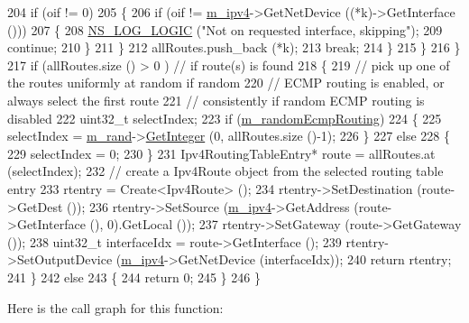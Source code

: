 \begin{DoxyCode}
204               \textcolor{keywordflow}{if} (oif != 0)
205                 \{
206                   \textcolor{keywordflow}{if} (oif != \hyperlink{classns3_1_1Ipv4GlobalRouting_a8ca97d33982a32fa41a98b56dbec2edc}{m\_ipv4}->GetNetDevice ((*k)->GetInterface ()))
207                     \{
208                       \hyperlink{group__logging_ga88acd260151caf2db9c0fc84997f45ce}{NS\_LOG\_LOGIC} (\textcolor{stringliteral}{"Not on requested interface, skipping"});
209                       \textcolor{keywordflow}{continue};
210                     \}
211                 \}
212               allRoutes.push\_back (*k);
213               \textcolor{keywordflow}{break};
214             \}
215         \}
216     \}
217   \textcolor{keywordflow}{if} (allRoutes.size () > 0 ) \textcolor{comment}{// if route(s) is found}
218     \{
219       \textcolor{comment}{// pick up one of the routes uniformly at random if random}
220       \textcolor{comment}{// ECMP routing is enabled, or always select the first route}
221       \textcolor{comment}{// consistently if random ECMP routing is disabled}
222       uint32\_t selectIndex;
223       \textcolor{keywordflow}{if} (\hyperlink{classns3_1_1Ipv4GlobalRouting_aecf81bc1f0bdbb4fff3fa7c56e4707a4}{m\_randomEcmpRouting})
224         \{
225           selectIndex = \hyperlink{classns3_1_1Ipv4GlobalRouting_a3cc74017538737dc3f6ec7f511a3481e}{m\_rand}->\hyperlink{classns3_1_1RandomVariableStream_a66cd94e6305ce7f000f1a9ff0fcb9aef}{GetInteger} (0, allRoutes.size ()-1);
226         \}
227       \textcolor{keywordflow}{else} 
228         \{
229           selectIndex = 0;
230         \}
231       Ipv4RoutingTableEntry* route = allRoutes.at (selectIndex); 
232       \textcolor{comment}{// create a Ipv4Route object from the selected routing table entry}
233       rtentry = Create<Ipv4Route> ();
234       rtentry->SetDestination (route->GetDest ());
236       rtentry->SetSource (\hyperlink{classns3_1_1Ipv4GlobalRouting_a8ca97d33982a32fa41a98b56dbec2edc}{m\_ipv4}->GetAddress (route->GetInterface (), 0).GetLocal ());
237       rtentry->SetGateway (route->GetGateway ());
238       uint32\_t interfaceIdx = route->GetInterface ();
239       rtentry->SetOutputDevice (\hyperlink{classns3_1_1Ipv4GlobalRouting_a8ca97d33982a32fa41a98b56dbec2edc}{m\_ipv4}->GetNetDevice (interfaceIdx));
240       \textcolor{keywordflow}{return} rtentry;
241     \}
242   \textcolor{keywordflow}{else} 
243     \{
244       \textcolor{keywordflow}{return} 0;
245     \}
246 \}
\end{DoxyCode}


Here is the call graph for this function\+:




